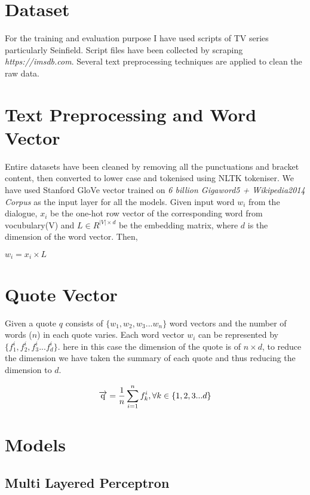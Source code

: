 \documentclass[conference]{IEEEtran}
\begin{document}
\section{Dataset}
For the training and evaluation purpose I have used scripts of TV series particularly Seinfield. Script files have been collected by scraping \emph{https://imsdb.com}. Several text preprocessing techniques are applied to clean the raw data.

\section{Text Preprocessing and Word Vector} 
Entire datasets have been cleaned by removing all the punctuations and bracket content, then converted to lower case and tokenised using NLTK tokeniser. We have used Stanford GloVe vector trained on \emph{6 billion Gigaword5 + Wikipedia2014 Corpus} as the input layer for all the models. Given input word $w_i$ from the dialogue, $x_i$ be the one-hot row vector of the corresponding word from vocubulary(V) and $L \in  R^{|V| \times d}$  be the embedding matrix, where $d$ is the dimension of the word vector. Then,

\begin{center}
	$w_i = x_i \times L$
\end{center}

\section{Quote Vector}
Given a quote $q$ consists of $\{w_1, w_2, w_3 ... w_n\}$ word vectors and the number of words ($n$) in each quote varies. Each word vector $w_i$ can be represented by $\{f_1^i, f_2^i, f_3^i ... f_d^i\}$. here in this case the dimension of the quote is of $n \times d$, to reduce the dimension we have taken the summary of each quote and thus reducing the dimension to $d$.

\begin{center}
	$$\overrightarrow{\rm q} = \frac{1}{n} \sum_{i=1}^{n} f_k^i , \forall k \in \{1,2,3 ... d\} $$
\end{center}

\section{Models}
\subsection{Multi Layered Perceptron}
\end{document}
